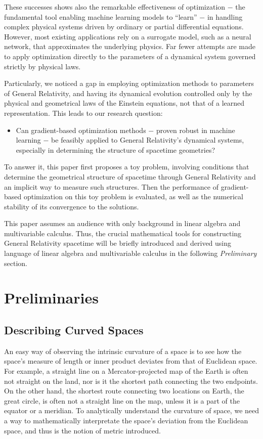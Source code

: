 \documentclass[conference]{IEEEtran}
\begin{document}
These successes shows also the remarkable effectiveness of 
optimization $-$ the fundamental tool enabling machine learning 
models to “learn” $-$ in handling complex physical systems driven 
by ordinary or partial differential equations. However, most 
existing applications rely on a surrogate model, such as a neural 
network, that approximates the underlying physics. Far fewer 
attempts are made to apply optimization directly to the parameters 
of a dynamical system governed strictly by physical laws. 

Particularly, we noticed a gap in employing optimization methods 
to parameters of General Relativity, and having its dynamical 
evolution controlled only by the physical and geometrical laws 
of the Einstein equations, not that of a learned representation. 
This leads to our research question: 
\begin{itemize}
    \item Can gradient-based optimization methods $-$ proven robust in machine learning $-$ be feasibly applied to General Relativity's dynamical systems, especially in determining the structure of spacetime geometries?
\end{itemize}
	
To answer it, this paper first proposes a toy problem, 
involving conditions that determine the geometrical structure of 
spacetime through General Relativity and an implicit way to 
measure such structures. Then the performance of gradient-based 
optimization on this toy problem is evaluated, as well as 
the numerical stability of its convergence to the solutions. 

This paper assumes an audience with only background in linear algebra 
and multivariable calculus. Thus, the crucial mathematical tools for 
constructing General Relativity spacetime will be briefly introduced 
and derived using language of linear algebra and multivariable calculus 
in the following \textit{Preliminary} section.


\section{Preliminaries}

\subsection{Describing Curved Spaces}

An easy way of observing the intrinsic curvature of a space is to see how
the space's measure of length or inner product deviates from that
of Euclidean space. For example, a straight line on a Mercator-projected 
map of the Earth is often not straight on the land, nor is it the 
shortest path connecting the two endpoints. On the other hand, the shortest 
route connecting two locations on Earth, the great circle, is often not a 
straight line on the map, unless it is a part of the equator or a meridian. 
To analytically understand the curvature of space, we need a way to mathematically 
interpretate the space's deviation from the Euclidean space, and thus is the notion 
of metric introduced.
\end{document}
